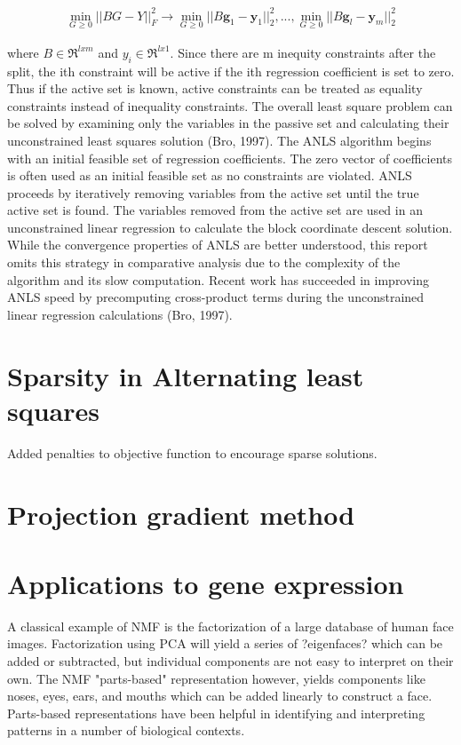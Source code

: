 \documentclass[final,leqno,onefignum,onetabnum]{siamltex1213}
\begin{document}
\begin{equation}
\begin{align} 
    \min_{G \ge 0} || BG-Y ||^{2}_{F} \to  \min_{G \ge 0} || B\textbf{g}_1-\textbf{y}_1 ||^{2}_{2}, ...,   \min_{G \ge 0} || B\textbf{g}_l-\textbf{y}_m ||^{2}_{2}
\end{align}
\end{equation}

where $ B \in \Re^{lxm}$ and $y_i \in \Re^{lx1}$. Since there are m inequity constraints after the split, the ith constraint will be active if the ith regression coefficient is set to zero. Thus if the active set is known, active constraints can be treated as equality constraints instead of inequality constraints. The overall least square problem can be solved by examining only the variables in the passive set and calculating their unconstrained least squares solution (Bro, 1997). The ANLS algorithm begins with an initial feasible set of regression coefficients. The zero vector of coefficients is often used as an initial feasible set as no constraints are violated. ANLS proceeds by iteratively removing variables from the active set until the true active set is found. The variables removed from the active set are used in an unconstrained linear regression to calculate the block coordinate descent solution. While the convergence properties of ANLS are better understood, this report omits this strategy in comparative analysis due to the complexity of the algorithm and its slow computation. Recent work has succeeded in improving ANLS speed by precomputing cross-product terms during the unconstrained linear regression calculations (Bro, 1997). 

\section{Sparsity in Alternating least squares}
Added penalties to objective function to encourage sparse solutions. 

\section{Projection gradient method} 


\section{Applications to gene expression}
A classical example of NMF is the factorization of a large database of human face images. Factorization using PCA will yield a series of ?eigenfaces? which can be added or subtracted, but individual components are not easy to interpret on their own. The NMF "parts-based" representation however, yields components like noses, eyes, ears, and mouths which can be added linearly to construct a face. Parts-based representations have been helpful in identifying and interpreting patterns in a number of biological contexts. 
\end{document}
